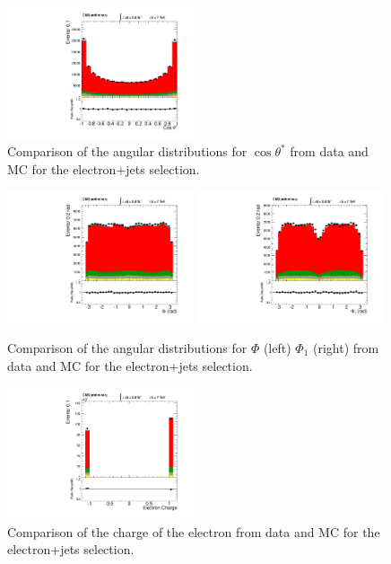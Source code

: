 \begin{figure}[h!t]
  {\centering
     \includegraphics[width=0.49\textwidth]{plots/2012_DataMC/el_hs.pdf}
    \caption{Comparison of the angular distributions for $\cos\theta^{\ast}$ from data and MC 
   for the electron+jets selection.}
\label{fig:elec_thetas}}
\end{figure}
\begin{figure}[h!t]
  {\centering
    \includegraphics[width=0.49\textwidth]{plots/2012_DataMC/el_phi.pdf}
    \includegraphics[width=0.49\textwidth]{plots/2012_DataMC/el_phib.pdf}
    \caption{Comparison of the angular distributions for $\Phi$  (left)
    $\Phi_{1}$ (right) from data and MC for the 
    electron+jets selection.}
\label{fig:elec_phi}}
\end{figure}

\begin{figure}[h!t]
  {\centering
    \includegraphics[width=0.49\textwidth]{plots/2012_DataMC/el_charge.pdf}
    \caption{Comparison of the charge of the electron from data and MC for the electron+jets selection.}
\label{fig:elec_chg}}
\end{figure}

